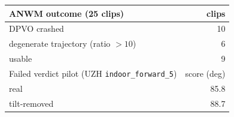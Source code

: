 \begin{tabular}{lr}
\toprule
ANWM outcome (25 clips) & clips \\
\midrule
DPVO crashed & 10 \\
degenerate trajectory (ratio $>10$) & 6 \\
usable & 9 \\
\midrule
Failed verdict pilot (UZH \texttt{indoor\_forward\_5}) & score (deg) \\
\midrule
real & 85.8 \\
tilt-removed & 88.7 \\
\bottomrule
\end{tabular}
